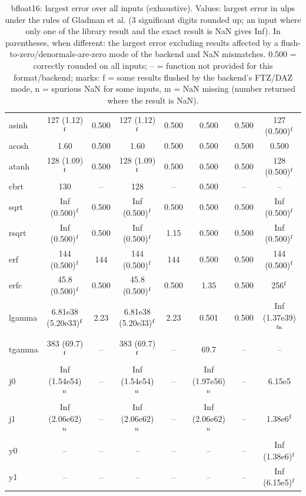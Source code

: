 \begin{table}
\begin{small}
\begin{tabular}{|l|cc|cc|cc|c|}
asinh & 127 (1.12)$^{\rm f}$ & 0.500 & 127 (1.12)$^{\rm f}$ & 0.500 & 0.500 & 0.500 & 127 (0.500)$^{\rm f}$ \\
acosh & 1.60 & 0.500 & 1.60 & 0.500 & 0.500 & 0.500 & 0.500 \\
atanh & 128 (1.09)$^{\rm f}$ & 0.500 & 128 (1.09)$^{\rm f}$ & 0.500 & 0.500 & 0.500 & 128 (0.500)$^{\rm f}$ \\
cbrt & 130 & -- & 128 & -- & 0.500 & -- & -- \\
sqrt & Inf (0.500)$^{\rm f}$ & 0.500 & Inf (0.500)$^{\rm f}$ & 0.500 & 0.500 & 0.500 & Inf (0.500)$^{\rm f}$ \\
rsqrt & Inf (0.500)$^{\rm f}$ & 0.500 & Inf (0.500)$^{\rm f}$ & 1.15 & 0.500 & 0.500 & Inf (0.500)$^{\rm f}$ \\
erf & 144 (0.500)$^{\rm f}$ & 144 & 144 (0.500)$^{\rm f}$ & 144 & 0.500 & 0.500 & 144 (0.500)$^{\rm f}$ \\
erfc & 45.8 (0.500)$^{\rm f}$ & 0.500 & 45.8 (0.500)$^{\rm f}$ & 0.500 & 1.35 & 0.500 & 256$^{\rm f}$ \\
lgamma & 6.81e38 (5.20e33)$^{\rm f}$ & 2.23 & 6.81e38 (5.20e33)$^{\rm f}$ & 2.23 & 0.501 & 0.500 & Inf (1.37e39)$^{\rm fn}$ \\
tgamma & 383 (69.7)$^{\rm f}$ & -- & 383 (69.7)$^{\rm f}$ & -- & 69.7 & -- & -- \\
j0 & Inf (1.54e54)$^{\rm n}$ & -- & Inf (1.54e54)$^{\rm n}$ & -- & Inf (1.97e56)$^{\rm n}$ & -- & 6.15e5 \\
j1 & Inf (2.06e62)$^{\rm n}$ & -- & Inf (2.06e62)$^{\rm n}$ & -- & Inf (2.06e62)$^{\rm n}$ & -- & 1.38e6$^{\rm f}$ \\
y0 & -- & -- & -- & -- & -- & -- & Inf (1.38e6)$^{\rm f}$ \\
y1 & -- & -- & -- & -- & -- & -- & Inf (6.15e5)$^{\rm f}$ \\
\hline
\end{tabular}
\end{small}
\caption{bfloat16: largest error over all inputs (exhaustive). Values: largest error in ulps under the rules of Gladman et al. (3 significant digits rounded up; an input where only one of the library result and the exact result is NaN gives Inf). In parentheses, when different: the largest error excluding results affected by a flush-to-zero/denormals-are-zero mode of the backend and NaN mismatches. 0.500 = correctly rounded on all inputs; -- = function not provided for this format/backend; marks: f = some results flushed by the backend's FTZ/DAZ mode, n = spurious NaN for some inputs, m = NaN missing (number returned where the result is NaN). }
\label{tab:bfloat16}
\end{table}
